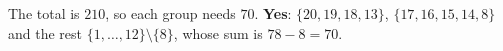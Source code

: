 The total is $210$, so each group needs $70$. \textbf{Yes}: $\{20,19,18,13\}$, $\{17,16,15,14,8\}$ and the rest $\{1,\dots,12\}\setminus\{8\}$, whose sum is $78-8=70$.
